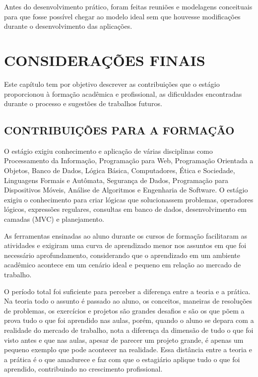 \documentclass[
  12pt,				%
  openany,
  oneside,
  a4paper,			%
  english,			%
  brazil
]{article}
\numberwithin{figure}{section}
\numberwithin{table}{section}
\begin{document}
Antes do desenvolvimento prático, foram feitas reuniões e modelagens conceituais para que fosse possível chegar ao modelo ideal sem que houvesse modificações durante o desenvolvimento das aplicações.


\section{CONSIDERAÇÕES FINAIS}


Este capítulo tem por objetivo descrever as contribuições que o estágio proporcionou à formação acadêmica e profissional, as dificuldades encontradas durante o processo e sugestões de trabalhos futuros.


\subsection{CONTRIBUIÇÕES PARA A FORMAÇÃO}

O estágio exigiu conhecimento e aplicação de várias disciplinas como Processamento da Informação, Programação para Web, Programação Orientada a Objetos, Banco de Dados, Lógica Básica, Computadores, Ética e Sociedade, Linguagens Formais e Autômata, Segurança de Dados, Programação para Dispositivos Móveis, Análise de Algoritmos e Engenharia de Software. O estágio exigiu o conhecimento para criar lógicas que solucionassem problemas,
operadores lógicos, expressões regulares, consultas em banco de dados, desenvolvimento em camadas (MVC) e planejamento.

As ferramentas ensinadas ao aluno durante os cursos de formação facilitaram as atividades e exigiram uma curva de aprendizado menor nos assuntos em que foi necessário aprofundamento, considerando que o aprendizado em um ambiente acadêmico acontece em um cenário ideal e pequeno em relação ao mercado de trabalho.

O período total foi suficiente para perceber a diferença entre a teoria e a prática. Na teoria todo o assunto é passado ao aluno, os conceitos, maneiras de resoluções de problemas, os exercícios e projetos são grandes desafios e são os que põem a prova tudo o que foi aprendido nas aulas, porém, quando o aluno se depara com a realidade do mercado de trabalho, nota a diferença da dimensão de tudo o que foi visto antes e que nas aulas, apesar de parecer um projeto grande, é apenas um pequeno exemplo que pode acontecer na realidade. Essa distância entre a teoria e a prática é o que amadurece e faz com que o estagiário aplique tudo o que foi aprendido, contribuindo no crescimento profissional.
\end{document}
